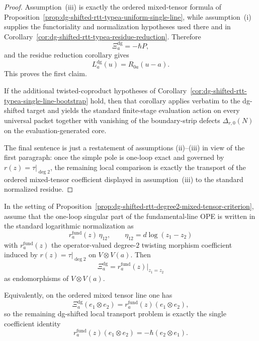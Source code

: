 \begin{proof}
Assumption~\textup{(iii)} is exactly the ordered mixed-tensor formula of
Proposition~\ref{prop:dg-shifted-rtt-typea-uniform-single-line}, while
assumption~\textup{(i)} supplies the functoriality and normalization
hypotheses used there and in
Corollary~\ref{cor:dg-shifted-rtt-typea-residue-reduction}.  Therefore
\[
\Xi_a^{\mathrm{dg}}=-\hbar P,
\]
and the residue reduction corollary gives
\[
L_a^{\mathrm{dg}}(u)=R_{0a}(u-a).
\]
This proves the first claim.

If the additional twisted-coproduct hypotheses of
Corollary~\ref{cor:dg-shifted-rtt-typea-single-line-bootstrap}
hold, then that corollary applies verbatim to the dg-shifted target
and yields the standard finite-stage evaluation action on every
universal packet together with vanishing of the boundary-strip defects
$\Delta_{r,0}(N)$ on the evaluation-generated core.

The final sentence is just a restatement of assumptions
\textup{(ii)}--\textup{(iii)} in view of the first paragraph: once the
simple pole is one-loop exact and governed by
$r(z)=\tau|_{\deg 2}$, the remaining local comparison is exactly the
transport of the ordered mixed-tensor coefficient displayed in
assumption~\textup{(iii)} to the standard normalized residue.
\end{proof}

\begin{corollary}
\label{cor:dg-shifted-rtt-seed-normalized-coefficient}
In the setting of
Proposition~\ref{prop:dg-shifted-rtt-degree2-mixed-tensor-criterion},
assume that the one-loop singular part of the fundamental-line OPE is
written in the standard logarithmic normalization as
\[
r_a^{\mathrm{fund}}(z)\,\eta_{12},
\qquad
\eta_{12}=d\log(z_1-z_2)
\]
with $r_a^{\mathrm{fund}}(z)$ the operator-valued degree-$2$ twisting
morphism coefficient induced by $r(z)=\tau|_{\deg 2}$ on
$V\otimes V(a)$.  Then
\[
\Xi_a^{\mathrm{dg}}
=
r_a^{\mathrm{fund}}(z)\big|_{z_1=z_2}
\]
as endomorphisms of $V\otimes V(a)$.

Equivalently, on the ordered mixed tensor line one has
\[
\Xi_a^{\mathrm{dg}}(e_1\otimes e_2)
=
r_a^{\mathrm{fund}}(z)(e_1\otimes e_2),
\]
so the remaining dg-shifted local transport problem is exactly the
single coefficient identity
\[
r_a^{\mathrm{fund}}(z)(e_1\otimes e_2)
=
-\hbar(e_2\otimes e_1).
\]
\end{corollary}

